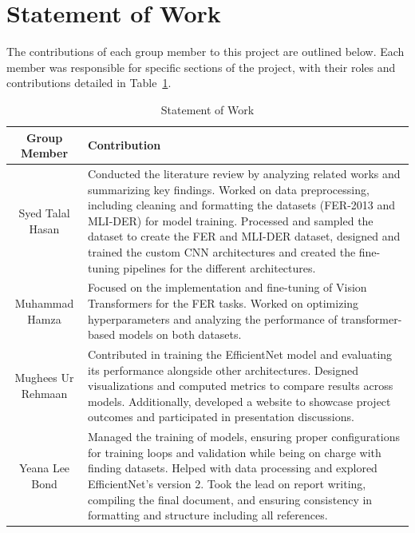 \documentclass[sigconf]{acmart}
\begin{document}
\nocite{*}




\section{Statement of Work}

The contributions of each group member to this project are outlined below. Each member was responsible for specific sections of the project, with their roles and contributions detailed in Table~\ref{tab:statement-of-work}.


\begin{table}[h]
  \caption{Statement of Work}
  \label{tab:statement-of-work}
  \centering
  \begin{tabular}{|c|p{12cm}|}
    \hline
    \textbf{Group Member} & \textbf{Contribution} \\
    \hline
    Syed Talal Hasan & Conducted the literature review by analyzing related works and summarizing key findings. Worked on data preprocessing, including cleaning and formatting the datasets (FER-2013 and MLI-DER) for model training. Processed and sampled the dataset to create the FER and MLI-DER dataset, designed and trained the custom CNN architectures and created the fine-tuning pipelines for the different architectures.  \\
    \hline
    Muhammad Hamza & Focused on the implementation and fine-tuning of Vision Transformers for the FER tasks. Worked on optimizing hyperparameters and analyzing the performance of transformer-based models on both datasets. \\
    \hline
    Mughees Ur Rehmaan & Contributed in training the EfficientNet model and evaluating its performance alongside other architectures. Designed visualizations and computed metrics to compare results across models. Additionally, developed a website to showcase project outcomes and participated in presentation discussions. \\
    \hline
    Yeana Lee Bond & Managed the training of models, ensuring proper configurations for training loops and validation while being on charge with finding datasets. Helped with data processing and explored EfficientNet's version 2. Took the lead on report writing, compiling the final document, and ensuring consistency in formatting and structure including all references. \\
    \hline
  \end{tabular}
\end{table}
\end{document}
